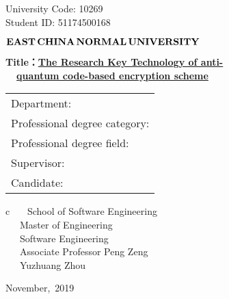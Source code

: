 \newpage

\pagestyle{empty}


\hspace*{\fill} {\large University Code: 10269}\\
\hspace*{\fill} {\large Student ID: 51174500168}

\vskip 2cm


\begin{center}
	{\Huge $ \bf{EAST}\,\bf{CHINA}\,\bf{NORMAL}\,
		\bf{UNIVERSITY}$}
\end{center}

\vskip 3cm

\begin{center}
	{\erhao \bf Title：\underline{The Research Key Technology of anti-}}\\
	{\erhao \bf  ~~\qquad \underline{quantum code-based encryption scheme}}
\end{center}


\vskip 2cm {\large
\begin{center}
\begin{tabular}{l}
Department:\\
Professional degree category:\\
Professional degree field:\\
Supervisor:\\
Candidate:
\end{tabular}
\begin{tabular}c
~~~School of Software Engineering       \\
\hline ~~~Master of Engineering    \\
\hline ~~~Software Engineering\\
\hline ~~~Associate Professor Peng Zeng\\
\hline ~~~Yuzhuang Zhou\\
\hline
\end{tabular}
\end{center}}

\vskip 30mm

\begin{center}
{\Large November,~2019}
\end{center}